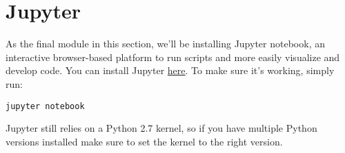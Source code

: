 \documentclass{article}
\begin{document}
\section{Jupyter}
As the final module in this section, we'll be installing Jupyter notebook, an interactive browser-based platform to run scripts and more easily visualize and develop code. You can install Jupyter \href{https://jupyter.org/}{here}. To make sure it's working, simply run:

 \begin{lstlisting}[escapechar=|]
 jupyter notebook
\end{lstlisting}

Jupyter still relies on a Python 2.7 kernel, so if you have multiple Python versions installed make sure to set the kernel to the right version.
\end{document}
